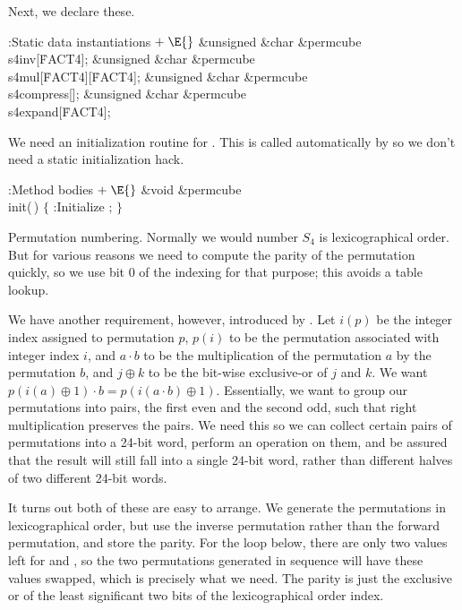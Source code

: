 Next, we declare these.

\Y\B\4:Static data instantiations\X${}\mathrel+\E{}$\6
\&{unsigned} \&{char} \&{permcube}\DC\\{s4inv}[\.{FACT4}];\6
\&{unsigned} \&{char} \&{permcube}\DC\\{s4mul}[\.{FACT4}][\.{FACT4}];\6
\&{unsigned} \&{char} \&{permcube}\DC\\{s4compress}[];\6
\&{unsigned} \&{char} \&{permcube}\DC\\{s4expand}[\.{FACT4}];\par
\fi

We need an initialization routine for .  This is called
automatically by  so we don't need a static
initialization hack.

\Y\B\4:Method bodies\X${}\mathrel+\E{}$\6
\&{void} \&{permcube}\DC\\{init}(\,)\1\1\2\2\6
${}\{{}$\1\6
:Initialize \X;\6
\4${}\}{}$\2\par
\fi

Permutation numbering.
Normally we would number $S_4$ is lexicographical order.  But for
various reasons we need to compute the parity of the permutation
quickly, so we use bit 0 of the indexing for that purpose; this avoids
a table lookup.

We have another
requirement, however, introduced by .  Let $i(p)$ be the
integer index assigned to permutation $p$, $p(i)$ to be the
permutation associated with integer index $i$, and $a\cdot b$ to be
the multiplication of the permutation $a$ by the permutation $b$,
and $j\oplus k$ to be the bit-wise exclusive-or of $j$ and $k$.
We want $p(i(a)\oplus 1)\cdot b=p(i(a\cdot b)\oplus 1)$.  Essentially,
we want to group our permutations into pairs, the first even and
the second odd, such that right multiplication preserves the pairs.
We need this so we can collect certain pairs of permutations into
a 24-bit word, perform an operation on them, and be assured that
the result will still fall into a single 24-bit word, rather than
different halves of two different 24-bit words.

It turns out both of these are easy to arrange.  We generate the
permutations in lexicographical order, but use the inverse
permutation rather than the forward permutation, and store the
parity.  For the  loop below, there are only two values left
for  and , so the two permutations generated in sequence
will have these values swapped, which is precisely what we
need.  The parity is just the exclusive or of the least significant
two bits of the lexicographical order index.

